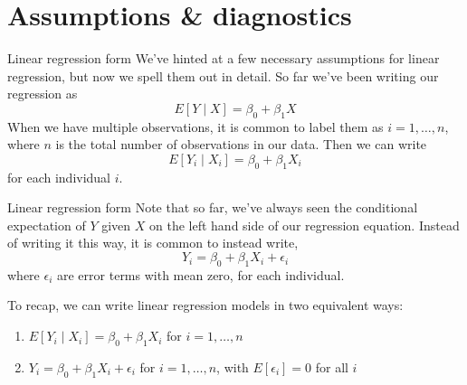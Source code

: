 \documentclass[10pt,t]{beamer}
\begin{document}
\section{Assumptions \& diagnostics}

\begin{frame}{Linear regression form}
We've hinted at a few necessary assumptions for linear regression, but now we spell them out in detail. So far we've been writing our regression as
$$
E[Y \mid X] = \beta_0 + \beta_1 X
$$
When we have multiple observations, it is common to label them as $i = 1, \dots, n$, where $n$ is the total number of observations in our data. Then we can write
$$
E[Y_i \mid X_i] = \beta_0 + \beta_1 X_i
$$
for each individual $i$. 
\end{frame}

\begin{frame}{Linear regression form}
Note that so far, we've always seen the conditional expectation of $Y$ given $X$ on the left hand side of our regression equation. Instead of writing it this way, it is common to instead write,
$$
Y_i = \beta_0 + \beta_1 X_i + \epsilon_i
$$
where $\epsilon_i$ are error terms with mean zero, for each individual. 

\vspace{0.3cm}

To recap, we can write linear regression models in two equivalent ways:
\smallskip
\begin{enumerate}
	\item $E[Y_i \mid X_i] = \beta_0 + \beta_1 X_i$ for $i = 1, \dots, n$
\medskip
	\item $Y_i = \beta_0 + \beta_1 X_i + \epsilon_i$ for $i = 1, \dots, n$, with $E[\epsilon_i] = 0$ for all $i$
\end{enumerate}

\end{frame}
\end{document}
